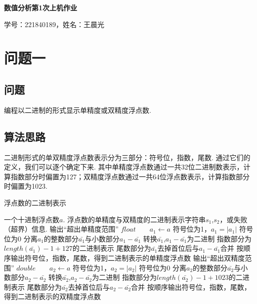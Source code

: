 \documentclass[UTF8,ctexart,a4paper,11pt,openany]{article}
\theoremstyle{definition}
\newcommand\e{\leftarrow}
\begin{document}
\begin{center}
{\huge \textbf{数值分析第1次上机作业}}

{\large 学号：221840189，姓名：王晨光}
\end{center}

\section{问题一}
    \subsection{问题}
    编程以二进制的形式显示单精度或双精度浮点数.
    \subsection{算法思路}
    二进制形式的单双精度浮点数表示分为三部分：符号位，指数，尾数. 通过它们的定义，我们可以逐个确定下来. 其中单精度浮点数通过一共32位二进制数表示，计算指数部分时偏置为127；双精度浮点数通过一共64位浮点数表示，计算指数部分时偏置为1023.
    \begin{algorithm}
        \caption{浮点数的二进制表示}
        \begin{algorithmic}[1] %
            \Require 一个十进制浮点数$a$.
            \Ensure 浮点数的单精度与双精度的二进制表示字符串$s_1$,$s_2$，或失败（超界）信息.
                    \State 输出“超出单精度范围”
                \Else
                    \State $float \qquad a_1\e a$
                        \State 符号位为1，$a_1=|a_1|$
                    \Else 
                        \State 符号位为0
                    \EndIf
                    \State 分离$a_1$的整数部分$\bar{a_1}$与小数部分$a_1-\bar{a_1}$
                    \State 转换$\bar{a_1}$,$a_1-\bar{a_1}$为二进制
                    \State 指数部分为$length(\bar{a_1})-1+127$的二进制表示
                    \State 尾数部分为$\bar{a_1}$去掉首位后与$a_1-\bar{a_1}$合并
                    \State 按顺序输出符号位，指数，尾数，得到二进制表示的单精度浮点数
                \EndIf
                    \State 输出“超出双精度范围”
                \Else
                    \State $double \qquad a_2\e a$
                        \State 符号位为1，$a_2=|a_2|$
                    \Else 
                        \State 符号位为0
                    \EndIf
                    \State 分离$a_2$的整数部分$\bar{a_2}$与小数部分$a_2-\bar{a_2}$
                    \State 转换$\bar{a_2}$,$a_2-\bar{a_2}$为二进制
                    \State 指数部分为$length(\bar{a_2})-1+1023$的二进制表示
                    \State 尾数部分为$\bar{a_2}$去掉首位后与$a_2-\bar{a_2}$合并
                    \State 按顺序输出符号位，指数，尾数，得到二进制表示的双精度浮点数
                \EndIf
            \EndFunction
        \end{algorithmic}
    \end{algorithm}
\end{document}
